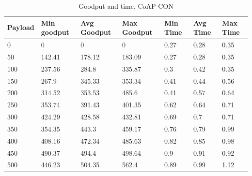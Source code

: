 \newpage

\begin{table}[H]
\scriptsize
\centering
\caption{Goodput and time, CoAP CON}
\label{goodputTimeCON}
\begin{tabular}{|l|l|l|l|l|l|l|}
\hline
\textbf{Payload} & \textbf{Min goodput} & \textbf{Avg Goodput} & \textbf{Max Goodput} & \textbf{Min Time} & \textbf{Avg Time} & \textbf{Max Time} \\ \hline
0                & 0                    & 0                    & 0                    & 0.27              & 0.28              & 0.35              \\ \hline
50               & 142.41               & 178.12               & 183.09               & 0.27              & 0.28              & 0.35              \\ \hline
100              & 237.56               & 284.8                & 335.87               & 0.3               & 0.42              & 0.35              \\ \hline
150              & 267.9                & 345.33               & 353.34               & 0.41              & 0.44              & 0.56              \\ \hline
200              & 314.52               & 353.53               & 485.6                & 0.41              & 0.57              & 0.64              \\ \hline
250              & 353.74               & 391.43               & 401.35               & 0.62              & 0.64              & 0.71              \\ \hline
300              & 424.29               & 428.58               & 432.81               & 0.69              & 0.7               & 0.71              \\ \hline
350              & 354.35               & 443.3                & 459.17               & 0.76              & 0.79              & 0.99              \\ \hline
400              & 408.16               & 472.34               & 485.63               & 0.82              & 0.85              & 0.98              \\ \hline
450              & 490.37               & 494.4                & 498.64               & 0.9               & 0.91              & 0.92              \\ \hline
500              & 446.23               & 504.35               & 562.4                & 0.89              & 0.99              & 1.12              \\ \hline

\end{tabular}
\end{table}

